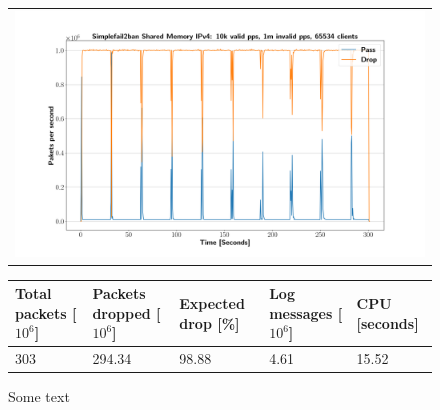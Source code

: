 \begin{figure}[p]
	\label{fig:simplefail2ban:shm:ip4:1m}
	\centering
	\scriptsize
	\begin{tabular}{c}
    	\centerline{\includegraphics[width=1.2\textwidth]{images/simplefail2ban_shm_ipv4_v10k_iv1m_c65534.png}}
	\end{tabular}
	\begin{tabular}{lllll}
		\toprule
		\textbf{Total packets [$10^6$]} & \textbf{Packets dropped [$10^6$]} & \textbf{Expected drop [\%]} & \textbf{Log messages [$10^6$]} & \textbf{CPU [seconds]} \\ \midrule 
		303 & 294.34 & 98.88 & 4.61 & 15.52 \\
		\bottomrule
	\end{tabular}
	\caption[Simplefail2ban Shared Memory IPv4 1m PPS]{Some text}
\end{figure}

